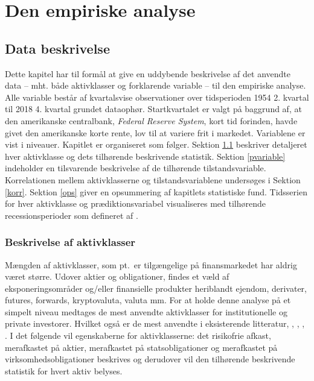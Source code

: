 \documentclass[
  a4paper,
  oneside]{memoir}
\begin{document}
\part{Den empiriske analyse}

\hypertarget{data-beskrivelse}{%
\chapter{Data beskrivelse}\label{data-beskrivelse}}

Dette kapitel har til formål at give en uddybende beskrivelse af det anvendte data -- mht. både aktivklasser og forklarende variable -- til den empiriske analyse. Alle variable består af kvartalsvise observationer over tidsperioden 1954 2. kvartal til 2018 4. kvartal grundet dataophør. Startkvartalet er valgt på baggrund af, at den amerikanske centralbank, \emph{Federal Reserve System}, kort tid forinden, havde givet den amerikanske korte rente, lov til at variere frit i markedet. Variablene er vist i niveauer. Kapitlet er organiseret som følger. Sektion \ref{aktivklasser} beskriver detaljeret hver aktivklasse og dets tilhørende beskrivende statistik. Sektion \ref{pvariable} indeholder en tilsvarende beskrivelse af de tilhørende tilstandsvariable. Korrelationen mellem aktivklasserne og tilstandsvariablene undersøges i Sektion \ref{korr}. Sektion \ref{ops} giver en opsummering af kapitlets statistiske fund. Tidsserien for hver aktivklasse og prædiktionsvariabel visualiseres med tilhørende recessionsperioder som defineret af \citep{NBER2020}.

\hypertarget{aktivklasser}{%
\section{Beskrivelse af aktivklasser}\label{aktivklasser}}

Mængden af aktivklasser, som pt.~er tilgængelige på finansmarkedet har aldrig været større. Udover aktier og obligationer, findes et væld af eksponeringsområder og/eller finansielle produkter heriblandt ejendom, derivater, futures, forwards, kryptovaluta, valuta mm. For at holde denne analyse på et simpelt niveau medtages de mest anvendte aktivklasser for institutionelle og private investorer. Hvilket også er de mest anvendte i eksisterende litteratur, \citep{CampVic2003, CampVic1999}, \citep{JurVic2011}, \citep{Engsted2012}, \citep{CampVicCha2003}. I det følgende vil egenskaberne for aktivklasserne: det risikofrie afkast, merafkastet på aktier, merafkastet på statsobligationer og merafkastet på virksomhedsobligationer beskrives og derudover vil den tilhørende beskrivende statistik for hvert aktiv belyses.
\end{document}
